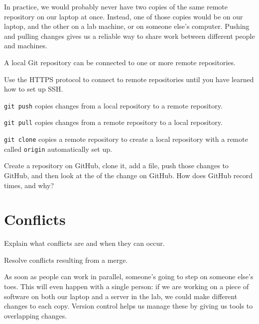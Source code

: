 \documentclass{book}
\begin{document}
In practice, we would probably never have two copies of the same remote
repository on our laptop at once. Instead, one of those copies would be
on our laptop, and the other on a lab machine, or on someone else's
computer. Pushing and pulling changes gives us a reliable way to share
work between different people and machines.

\begin{keypoints}
\begin{swcitemize}
\item
  A local Git repository can be connected to one or more remote
  repositories.
\item
  Use the HTTPS protocol to connect to remote repositories until you
  have learned how to set up SSH.
\item
  \texttt{git push} copies changes from a local repository to a remote
  repository.
\item
  \texttt{git pull} copies changes from a remote repository to a local
  repository.
\item
  \texttt{git clone} copies a remote repository to create a local
  repository with a remote called \texttt{origin} automatically set up.
\end{swcitemize}
\end{keypoints}

\begin{challenge}
  Create a repository on GitHub, clone it, add a file, push those
  changes to GitHub, and then look at the
   of the change on GitHub. How does
  GitHub record times, and why?
\end{challenge}

\section{Conflicts}

\begin{objectives}
\begin{swcitemize}
\item
  Explain what conflicts are and when they can occur.
\item
  Resolve conflicts resulting from a merge.
\end{swcitemize}
\end{objectives}

As soon as people can work in parallel, someone's going to step on
someone else's toes. This will even happen with a single person: if we
are working on a piece of software on both our laptop and a server in
the lab, we could make different changes to each copy. Version control
helps us manage these  by giving us
tools to  overlapping changes.
\end{document}
